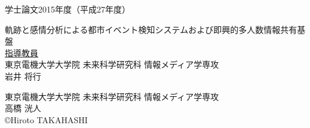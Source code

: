 \pagestyle{empty}
\begin{center}

\LARGE{学士論文\hspace{10mm}2015年度（平成27年度）}\\

\vspace{19mm}

\huge{軌跡と感情分析による都市イベント検知システムおよび即興的多人数情報共有基盤}\\
\vspace{60mm}
\large{\underline{指導教員}}\\
\large{東京電機大学大学院 未来科学研究科 情報メディア学専攻}\\
\Large{岩井 将行}\\

\vspace{40mm}

\large{東京電機大学大学院 未来科学研究科 情報メディア学専攻}\\
\LARGE{高橋 洸人}\\
\large{\copyright Hiroto TAKAHASHI}\\
\end{center}
